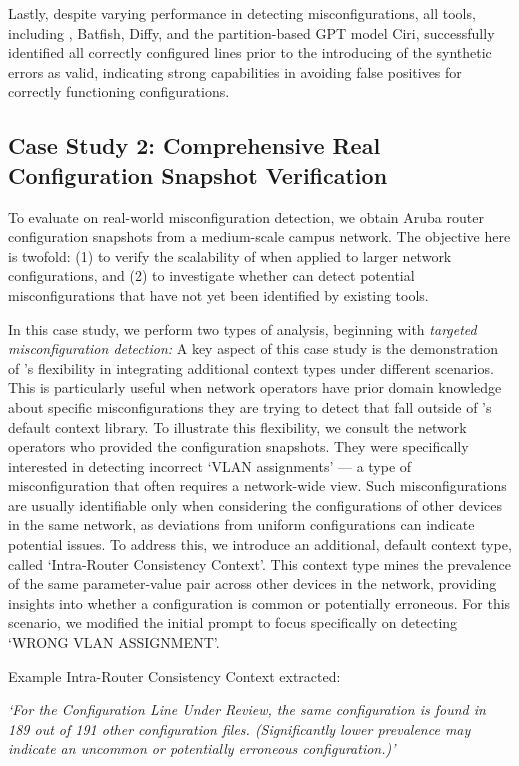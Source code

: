 Lastly, despite varying performance in detecting misconfigurations, all tools, including \sysname{}, Batfish, Diffy, and the partition-based GPT model Ciri, successfully identified all correctly configured lines prior to the introducing of the synthetic errors as valid, indicating strong capabilities in avoiding false positives for correctly functioning configurations. 

\subsection{Case Study 2: Comprehensive Real Configuration Snapshot Verification}
To evaluate \sysname{} on real-world misconfiguration detection, we obtain Aruba router configuration snapshots from a medium-scale campus network. The objective here is twofold: (1) to verify the scalability of \sysname{} when applied to larger network configurations, and (2) to investigate whether \sysname{} can detect potential misconfigurations that have not yet been identified by existing tools.


In this case study, we perform two types of analysis, beginning with \textit{targeted misconfiguration detection:} A key aspect of this case study is the demonstration of \sysname{}'s flexibility in integrating additional context types under different scenarios. This is particularly useful when network operators have prior domain knowledge about specific misconfigurations they are trying to detect that fall outside of \sysname{}'s default context library.
To illustrate this flexibility, we consult the network operators who provided the configuration snapshots. They were specifically interested in detecting incorrect `VLAN assignments' --- a type of misconfiguration that often requires a network-wide view. Such misconfigurations are usually identifiable only when considering the configurations of other devices in the same network, as deviations from uniform configurations can indicate potential issues.
To address this, we introduce an additional, default context type, called `Intra-Router Consistency Context'.  This context type mines  the prevalence of the same parameter-value pair across other devices in the network, providing insights into whether a configuration is common or potentially erroneous. For this scenario, we modified the initial prompt to focus specifically on detecting `WRONG VLAN ASSIGNMENT'.

Example Intra-Router Consistency Context extracted:

\textit{`For the Configuration Line Under Review, the same configuration is found in 189 out of 191 other configuration files. (Significantly lower prevalence may indicate an uncommon or potentially erroneous configuration.)'}

